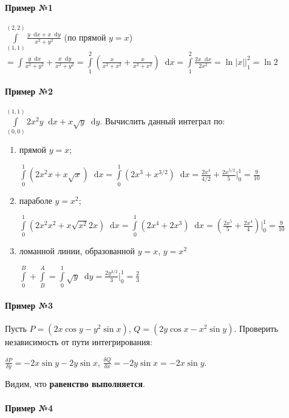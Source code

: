 \documentclass{article}
\newcommand*\diff{\mathop{}\!\mathrm{d}}
\begin{document}
\paragraph{Пример №1}

$\int\limits_{(1, 1)}^{(2, 2)} \frac{y \diff x + x \diff y}{x^2 + y^2}$ (по прямой $y = x$) $= \int \frac{y \diff x}{x^2 + y^2} + \frac{x \diff y}{x^2 + y^2} = \int\limits_{1}^{2} (\frac{x}{x^2 + x^2} + \frac{x}{x^2 + x^2}) \diff x = \int\limits_{1}^{2} \frac{2x \diff x}{2x^2} = \ln |x| \bigg|_{1}^{2} = \ln 2$

\paragraph{Пример №2}

$\int\limits_{(0, 0)}^{(1, 1)} 2x^2 y \diff x + x \sqrt{y} \diff y$. Вычислить данный интеграл по:

\begin{enumerate}
    \item прямой $y = x$;
    
    $\int\limits_{0}^{1} (2x^2 x + x \sqrt{x}) \diff x = \int\limits_{0}^{1} (2x^3 + x^{3/2}) \diff x = \frac{2x^4}{4/2} + \frac{2x^{5/2}}{5} \bigg|_{0}^{1} = \frac{9}{10}$
    \item параболе $y = x^2$;
    
    $\int\limits_{0}^{1} (2x^2 x^2 + x \sqrt{x^2} 2x) \diff x = \int\limits_{0}^{1} (2x^4 + 2x^3) \diff x = (\frac{2x^{5}}{5} + \frac{2x^{4}}{4}) \bigg|_{0}^{1} = \frac{9}{10}$
    \item ломанной линии, образованной $y = x$, $y = x^2$
    
    $\int\limits_{0}^{B} + \int\limits_{B}^{A} = \int\limits_{0}^{1} \sqrt{y} \diff y = \frac{2y^{3/2}}{3} \bigg|_{0}^{1} = \frac{2}{3}$
\end{enumerate}

\paragraph{Пример №3}

Пусть $P = (2x \cos y - y^2 \sin x)$, $Q = (2y \cos x - x^2 \sin y)$. Проверить независимость от пути интегрирования:

$\frac{\delta P}{\delta y} = -2x \sin y - 2 y \sin x$, $\frac{\delta Q}{\delta x} = -2y \sin x = -2x\sin y$.

Видим, что \textbf{равенство выполняется}.

\paragraph{Пример №4}
\end{document}

